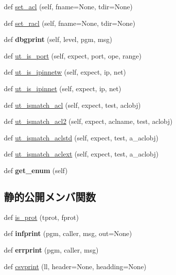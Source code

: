 \begin{DoxyCompactItemize}
\item 
def \mbox{\hyperlink{classCTextFsm_1_1CTextFsm_a6e940ba9e9159eef2513342466e2fb11}{set\+\_\+acl}} (self, fname=None, tdir=None)
\item 
def \mbox{\hyperlink{classCTextFsm_1_1CTextFsm_af6338783bf6b3879a1e522d534602a96}{set\+\_\+racl}} (self, fname=None, tdir=None)
\item 
\mbox{\label{classCTextFsm_1_1CTextFsm_a807b340e6b101f17f1b851bf6272ee52}} 
def {\bfseries dbgprint} (self, level, pgm, msg)
\item 
def \mbox{\hyperlink{classCTextFsm_1_1CTextFsm_a9cec3d73733c16ef6bb8d83724454b32}{ut\+\_\+is\+\_\+port}} (self, expect, port, ope, range)
\item 
def \mbox{\hyperlink{classCTextFsm_1_1CTextFsm_a2e1e78dbb799c91a8174c09aab2ca30b}{ut\+\_\+is\+\_\+ipinnetw}} (self, expect, ip, net)
\item 
def \mbox{\hyperlink{classCTextFsm_1_1CTextFsm_ad48b822b0ee1c57c37e671a1b380d0bb}{ut\+\_\+is\+\_\+ipinnet}} (self, expect, ip, net)
\item 
def \mbox{\hyperlink{classCTextFsm_1_1CTextFsm_a9708d882f46a66cee6ae8c47766ef50b}{ut\+\_\+ismatch\+\_\+acl}} (self, expect, test, aclobj)
\item 
def \mbox{\hyperlink{classCTextFsm_1_1CTextFsm_ae3ecec0b7d2f27e81faee975998bd860}{ut\+\_\+ismatch\+\_\+acl2}} (self, expect, aclname, test, aclobj)
\item 
def \mbox{\hyperlink{classCTextFsm_1_1CTextFsm_a82616f58ed71035bc1b443e934692361}{ut\+\_\+ismatch\+\_\+aclstd}} (self, expect, test, a\+\_\+aclobj)
\item 
def \mbox{\hyperlink{classCTextFsm_1_1CTextFsm_ac5a745b22a0fb24ebcfc2a77bf430429}{ut\+\_\+ismatch\+\_\+aclext}} (self, expect, test, a\+\_\+aclobj)
\item 
\mbox{\label{classCTextFsm_1_1CTextFsm_a9440c97d6fa11decc6aa29a1112157d8}} 
def {\bfseries get\+\_\+enum} (self)
\end{DoxyCompactItemize}
\subsection*{静的公開メンバ関数}
\begin{DoxyCompactItemize}
\item 
def \mbox{\hyperlink{classCTextFsm_1_1CTextFsm_a2d26ded29b0a795000470f2f9d9186cb}{is\+\_\+prot}} (tprot, fprot)
\item 
\mbox{\label{classCTextFsm_1_1CTextFsm_ac33bf15e285e10cb094a5aaa179f1824}} 
def {\bfseries infprint} (pgm, caller, msg, out=None)
\item 
\mbox{\label{classCTextFsm_1_1CTextFsm_af5fa599194aea3773d6e903b5fded7be}} 
def {\bfseries errprint} (pgm, caller, msg)
\item 
def \mbox{\hyperlink{classCTextFsm_1_1CTextFsm_a06b5d47fdfe2bf0bd79ba735e941c343}{csvprint}} (ll, header=None, headding=None)
\end{DoxyCompactItemize}
